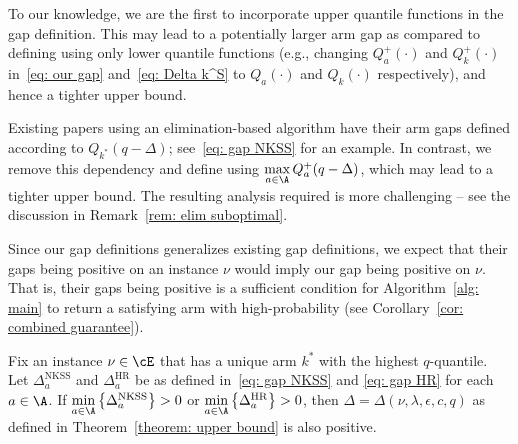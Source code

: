 \begin{remark}
    \label{rem: upper quantile}
    To our knowledge, we are the first to incorporate upper quantile functions in the gap definition.
    This may lead to a potentially larger arm gap as compared to defining using only lower quantile functions (e.g., changing $Q_a^+(\cdot)$ and $Q_k^+(\cdot)$ in~\eqref{eq: our gap} and~\eqref{eq: Delta k^S} to $Q_a(\cdot)$ and $Q_k(\cdot)$ respectively), and hence a tighter upper bound.
\end{remark}

\begin{remark}
    Existing papers using an elimination-based algorithm have their arm gaps defined according to $Q_{k^*}(q-\Delta)$; see~\eqref{eq: gap NKSS} for an example.
    In contrast, we remove this dependency and define using $\max\limits_{a \in \A  }
        Q^+_{a}(q - \Delta)$, which may lead to a tighter upper bound.  
    The resulting analysis required is more challenging --
    see the discussion in Remark~\ref{rem: elim suboptimal}. 
\end{remark}



Since our gap definitions generalizes existing gap definitions, we expect that their gaps being positive on an instance $\nu$ would imply our gap being positive on $\nu$. That is, their gaps being positive is a sufficient condition for Algorithm~\ref{alg: main} to return a satisfying arm with high-probability (see Corollary~\ref{cor: combined guarantee}).

\begin{proposition}
\label{prop: generalized formulation}
     Fix an instance $\nu \in \cE$ that has a unique arm $k^*$ with the highest $q$-quantile. Let $\Delta_a^{\mathrm{NKSS}}$ and 
$\Delta_a^{\mathrm{HR}}$ be as defined in~\eqref{eq: gap NKSS} and \eqref{eq: gap HR} for each $a \in \A$.
If $\min\limits_{a \in \A} 
\left\{ \Delta_a^{\mathrm{NKSS}} \right\} > 0$
 or
 $\min\limits_{a \in \A} 
\left\{ \Delta_a^{\mathrm{HR}} \right\} > 
 0$, then $\Delta =  \Delta(\nu, \lambda, \epsilon, c, q) $ as defined in Theorem~\ref{theorem: upper bound} is also positive.
\end{proposition}

